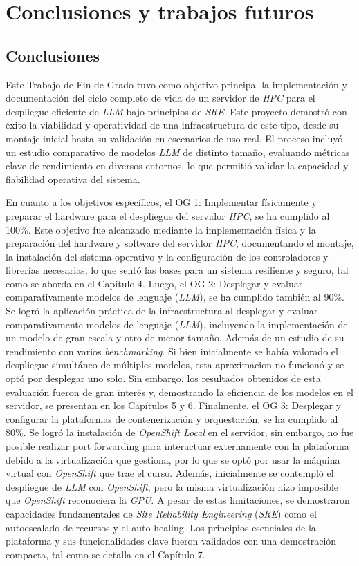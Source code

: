 \chapter{Conclusiones y trabajos futuros}

\section{Conclusiones}
Este Trabajo de Fin de Grado tuvo como objetivo principal la implementación y documentación del ciclo completo de vida de un servidor de \textit{HPC} para el despliegue eficiente de \textit{LLM} bajo principios de \textit{SRE}. Este proyecto demostró con éxito la viabilidad y operatividad de una infraestructura de este tipo, desde su montaje inicial hasta su validación en escenarios de uso real. El proceso incluyó un estudio comparativo de modelos \textit{LLM} de distinto tamaño, evaluando métricas clave de rendimiento en diversos entornos, lo que permitió validar la capacidad y fiabilidad operativa del sistema.

En cuanto a los objetivos específicos, el OG 1: Implementar físicamente y preparar el hardware para el despliegue del servidor \textit{HPC}, se ha cumplido al 100\%. Este objetivo fue alcanzado mediante la implementación física y la preparación del hardware y software del servidor \textit{HPC}, documentando el montaje, la instalación del sistema operativo y la configuración de los controladores y librerías necesarias, lo que sentó las bases para un sistema resiliente y seguro, tal como se aborda en el Capítulo 4. Luego, el OG 2: Desplegar y evaluar comparativamente modelos de lenguaje (\textit{LLM}), se ha cumplido también al 90\%. Se logró la aplicación práctica de la infraestructura al desplegar y evaluar comparativamente modelos de lenguaje (\textit{LLM}), incluyendo la implementación de un modelo de gran escala y otro de menor tamaño. Además de un estudio de su rendimiento con varios \textit{benchmarking}. Si bien inicialmente se había valorado el despliegue simultáneo de múltiples modelos, esta aproximacion no funcionó y se optó por desplegar uno solo. Sin embargo, los resultados obtenidos de esta evaluación fueron de gran interés y,  demostrando la eficiencia de los modelos en el servidor, se presentan en los Capítulos 5 y 6. Finalmente, el OG 3: Desplegar y configurar la plataformas de contenerización y orquestación, se ha cumplido al 80\%. Se logró la instalación de \textit{OpenShift Local} en el servidor, sin embargo, no fue posible realizar port forwarding para interactuar externamente con la plataforma debido a la virtualización que gestiona, por lo que se optó por usar la máquina virtual con \textit{OpenShift} que trae el curso. Además, inicialmente se contempló el despliegue de \textit{LLM} con \textit{OpenShift}, pero la misma virtualización hizo imposible que \textit{OpenShift} reconociera la \textit{GPU}. A pesar de estas limitaciones, se demostraron capacidades fundamentales de \textit{Site Reliability Engineering} (\textit{SRE}) como el autoescalado de recursos y el auto-healing. Los principios esenciales de la plataforma y sus funcionalidades clave fueron validados con una demostración compacta, tal como se detalla en el Capítulo 7.

